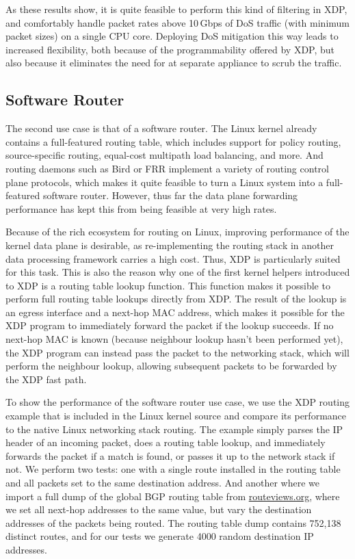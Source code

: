 \documentclass[10pt,sigconf]{acmart}
\begin{document}
As these results show, it is quite feasible to perform this kind of filtering in
XDP, and comfortably handle packet rates above 10\,Gbps of DoS traffic (with
minimum packet sizes) on a single CPU core. Deploying DoS mitigation this way
leads to increased flexibility, both because of the programmability offered by
XDP, but also because it eliminates the need for at separate appliance to scrub
the traffic.

\subsection{Software Router}
\label{sec:fwd-usecase}
The second use case is that of a software router. The Linux kernel already
contains a full-featured routing table, which includes support for policy
routing, source-specific routing, equal-cost multipath load balancing, and more.
And routing daemons such as Bird or FRR implement a variety of routing control
plane protocols, which makes it quite feasible to turn a Linux system into a
full-featured software router. However, thus far the data plane forwarding
performance has kept this from being feasible at very high rates.

Because of the rich ecosystem for routing on Linux, improving performance of the
kernel data plane is desirable, as re-implementing the routing stack in another
data processing framework carries a high cost. Thus, XDP is particularly suited
for this task. This is also the reason why one of the first kernel helpers
introduced to XDP is a routing table lookup function. This function makes it
possible to perform full routing table lookups directly from XDP. The result of
the lookup is an egress interface and a next-hop MAC address, which makes it
possible for the XDP program to immediately forward the packet if the lookup
succeeds. If no next-hop MAC is known (because neighbour lookup hasn't been
performed yet), the XDP program can instead pass the packet to the networking
stack, which will perform the neighbour lookup, allowing subsequent packets to
be forwarded by the XDP fast path.

To show the performance of the software router use case, we use the XDP routing
example that is included in the Linux kernel source and compare its performance
to the native Linux networking stack routing. The example simply parses the IP
header of an incoming packet, does a routing table lookup, and immediately
forwards the packet if a match is found, or passes it up to the network stack if
not. We perform two tests: one with a single route installed in the routing
table and all packets set to the same destination address. And another where we
import a full dump of the global BGP routing table from \url{routeviews.org},
where we set all next-hop addresses to the same value, but vary the destination
addresses of the packets being routed. The routing table dump contains 752,138
distinct routes, and for our tests we generate 4000 random destination IP
addresses.
\end{document}
